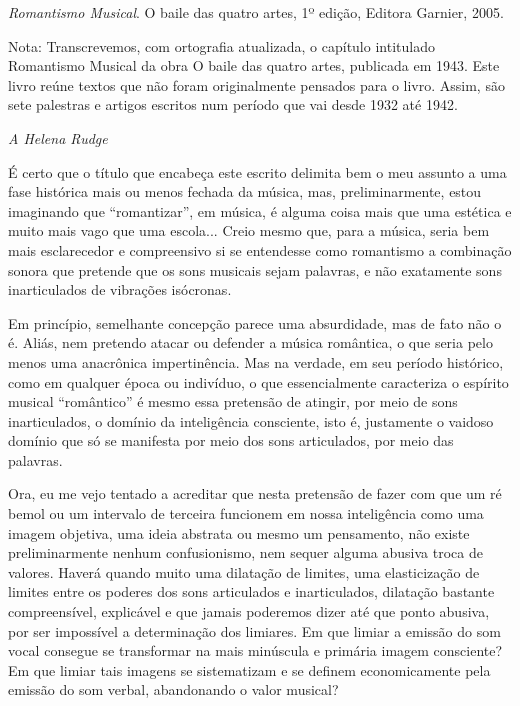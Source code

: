 \emph{Romantismo Musical}. O baile das quatro artes, 1º edição, Editora
Garnier, 2005.

Nota: Transcrevemos, com ortografia atualizada, o capítulo intitulado
Romantismo Musical da obra O baile das quatro artes, publicada em 1943.
Este livro reúne textos que não foram originalmente pensados para o
livro. Assim, são sete palestras e artigos escritos num período que vai
desde 1932 até 1942.

\emph{A Helena Rudge}

É certo que o título que encabeça este escrito delimita bem o meu
assunto a uma fase histórica mais ou menos fechada da música, mas,
preliminarmente, estou imaginando que ``romantizar'', em música, é
alguma coisa mais que uma estética e muito mais vago que uma escola...
Creio mesmo que, para a música, seria bem mais esclarecedor e
compreensivo si se entendesse como romantismo a combinação sonora que
pretende que os sons musicais sejam palavras, e não exatamente sons
inarticulados de vibrações isócronas.

Em princípio, semelhante concepção parece uma absurdidade, mas de fato
não o é. Aliás, nem pretendo atacar ou defender a música romântica, o
que seria pelo menos uma anacrônica impertinência. Mas na verdade, em
seu período histórico, como em qualquer época ou indivíduo, o que
essencialmente caracteriza o espírito musical ``romântico'' é mesmo essa
pretensão de atingir, por meio de sons inarticulados, o domínio da
inteligência consciente, isto é, justamente o vaidoso domínio que só se
manifesta por meio dos sons articulados, por meio das palavras.

Ora, eu me vejo tentado a acreditar que nesta pretensão de fazer com que
um ré bemol ou um intervalo de terceira funcionem em nossa inteligência
como uma imagem objetiva, uma ideia abstrata ou mesmo um pensamento, não
existe preliminarmente nenhum confusionismo, nem sequer alguma abusiva
troca de valores. Haverá quando muito uma dilatação de limites, uma
elasticização de limites entre os poderes dos sons articulados e
inarticulados, dilatação bastante compreensível, explicável e que jamais
poderemos dizer até que ponto abusiva, por ser impossível a determinação
dos limiares. Em que limiar a emissão do som vocal consegue se
transformar na mais minúscula e primária imagem consciente? Em que
limiar tais imagens se sistematizam e se definem economicamente pela
emissão do som verbal, abandonando o valor musical?

